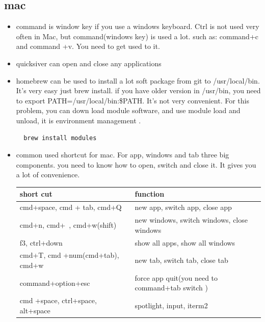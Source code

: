 \documentclass[paper=8.5in:11in, twoside, 12pt, pagesize=pdftex]{book}
\begin{document}
\subsection{mac}
\begin{itemize}
	
 	\item command is window key if you use a windows keyboard.  Ctrl is not used very often in Mac, but command(windows key) is used a lot. such as: command+c and command +v.  You need to get used to it. 
 
  	\item quicksiver can open and close any applications
  	
  	\item homebrew can be used to install a lot soft package from git to /usr/local/bin. It's very easy just brew install. 
  if you have older version in /usr/bin, you need to export PATH=/usr/local/bin:\$PATH. It's not very convenient. For this problem, you can down load module software, and use module load and unload, it is  environment management . 
  \begin{verbatim}
  brew install modules 
  \end{verbatim}
    
  	\item common used shortcut for mac. For app, windows and tab three big components. you need to know how to open, switch and close it.  It gives you a lot of convenience.  
  
  \begin{tabular}{|p{}|p{}|}
  	\hline
  	short cut& function  \\
  	\hline
  	cmd+space, cmd + tab, cmd+Q& new app,  switch app, close app \\
  	\hline
  	 cmd+n, cmd+~, cmd+w(shift) & new windows, switch windows, close windows \\
  	 
  	\hline
  	 f3, ctrl+down & show all apps, show all windows  \\
  	 
  	\hline
  	cmd+T, cmd +num(cmd+tab), cmd+w &new tab,  switch tab, close tab  \\
  	
  	\hline command+option+esc & force app quit(you need to command+tab switch ) \\
  	
  	\hline
  	cmd +space, ctrl+space, alt+space& spotlight, input, iterm2  \\
  

\end{tabular}
\end{itemize}
\end{document}
